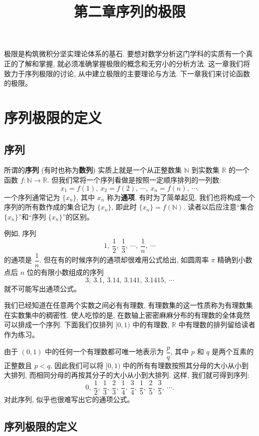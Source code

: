 \documentclass[UTF8,12pt,a4paper,fontset=fandol]{ctexart}
\title{第二章\quad 序列的极限}
\author{}
\date{}
\begin{document}
\maketitle

极限是构筑微积分坚实理论体系的基石. 要想对数学分析这门学科的实质有一个真正的了解和掌握, 就必须准确掌握极限的概念和无穷小的分析方法. 这一章我们将致力于序列极限的讨论, 从中建立极限的主要理论与方法. 下一章我们来讨论函数的极限。

\section{序列极限的定义}

\subsection{序列}

所谓的\textbf{序列} (有时也称为\textbf{数列}) 实质上就是一个从正整数集 $\mathbb{N}$ 到实数集 $\mathbb{R}$ 的一个函数 $f:\mathbb{N}\to\mathbb{R}$. 但我们常将一个序列看做是按照一定顺序排列的一列数:
\[
  x_1=f(1),\ x_2=f(2),\ \cdots,\ x_n=f(n),\ \cdots .
\]
一个序列通常记为 $\{x_n\}$, 其中 $x_n$ 称为\textbf{通项}. 有时为了简单起见, 我们也将构成一个序列的所有数作成的集合记为 $\{x_n\}$, 即此时 $\{x_n\}=f(\mathbb{N})$. 读者以后应注意``集合 $\{x_n\}$''和``序列 $\{x_n\}$''的区别。

例如, 序列
\[
  1,\ \frac12,\ \frac13,\ \cdots,\ \frac1n,\ \cdots
\]
的通项是 $\dfrac1n$. 但在有的时候序列的通项却很难用公式给出, 如圆周率 $\pi$ 精确到小数点后 $n$ 位的有限小数组成的序列
\[
  3,\ 3.1,\ 3.14,\ 3.141,\ 3.1415,\ \cdots
\]
就不可能写出通项公式。

我们已经知道在任意两个实数之间必有有理数, 有理数集的这一性质称为有理数集在实数集中的稠密性. 使人吃惊的是, 在数轴上密密麻麻分布的有理数的全体竟然可以排成一个序列. 下面我们仅排列 $[0,1)$ 中的有理数, $\mathbb{R}$ 中有理数的排列留给读者作为练习。

由于 $(0,1)$ 中的任何一个有理数都可唯一地表示为 $\dfrac pq$, 其中 $p$ 和 $q$ 是两个互素的正整数且 $p<q$, 因此我们可以将 $[0,1)$ 中的所有有理数按照其分母的大小从小到大排列, 而相同分母的再按其分子的大小从小到大排列. 这样, 我们就可得到序列:
\[
  0,\ \frac12,\ \frac13,\ \frac23,\ \frac14,\ \frac34,\ \frac15,\ \frac25,\ \frac35,\ \cdots .
\]
对此序列, 似乎也很难写出它的通项公式。

\subsection{序列极限的定义}
\end{document}
